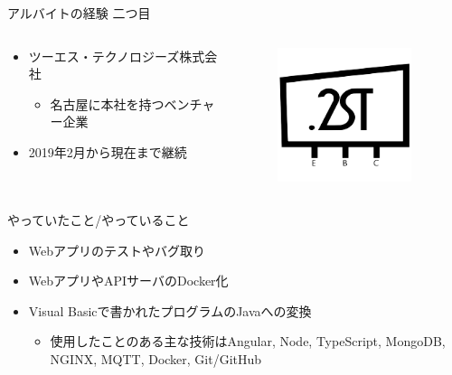 \documentclass[12pt, unicode]{beamer}
\begin{document}
\begin{frame}{アルバイトの経験 二つ目}
  \begin{columns}
    \begin{column}{0.8\textwidth}
      \begin{itemize}
        \item ツーエス・テクノロジーズ株式会社
        \begin{itemize}
          \item 名古屋に本社を持つベンチャー企業
        \end{itemize}
        \item 2019年2月から現在まで継続
      \end{itemize}
    \end{column}

    \begin{column}{0.2\textwidth}
      \begin{figure}[h]
        \centering
        \includegraphics[width=0.9\textwidth]{pictures/2ST.png}
      \end{figure}
    \end{column}
  \end{columns}

  \begin{block}{やっていたこと/やっていること}
    \begin{itemize}
      \item Webアプリのテストやバグ取り
      \item WebアプリやAPIサーバのDocker化
      \item Visual Basicで書かれたプログラムのJavaへの変換
      \begin{itemize}
        \item 使用したことのある主な技術はAngular, Node, TypeScript, MongoDB, NGINX, MQTT, Docker, Git/GitHub
      \end{itemize}
    \end{itemize}
  \end{block}
\end{frame}
\end{document}
